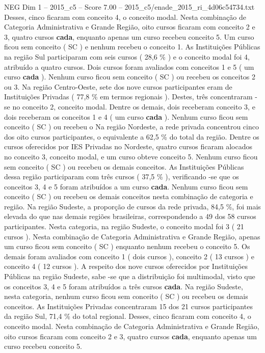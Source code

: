 \begin{textsample}{NEG Dim 1 – 2015\_c5 – Score 7.00 – 2015\_c5/enade\_2015\_ri\_4d06c54734.txt}
Desses, cinco ficaram com conceito 4, o conceito modal.
Nesta combinação de Categoria Administrativa e Grande Região, oito cursos ficaram com conceito 2 e 3, quatro cursos \textbf{cada}, enquanto apenas um curso recebeu conceito 5.
Um curso ficou sem conceito ( SC ) e nenhum recebeu o conceito 1.
As Instituições Públicas na região Sul participaram com seis cursos ( 28,6 \% ) e o conceito modal foi 4, atribuído a quatro cursos.
Dois cursos foram avaliados com conceitos 1 e 5 ( um curso \textbf{cada} ).
Nenhum curso ficou sem conceito ( SC ) ou recebeu os conceitos 2 ou 3.
Na região Centro-Oeste, sete dos nove cursos participantes eram de Instituições Privadas ( 77,8 \% em termos regionais ).
Destes, três concentraram -se no conceito 2, conceito modal.
Dentre os demais, dois receberam conceito 3, e dois receberam os conceitos 1 e 4 ( um curso \textbf{cada} ).
Nenhum curso ficou sem conceito ( SC ) ou recebeu o Na região Nordeste, a rede privada concentrou cinco dos oito cursos participantes, o equivalente a 62,5 \% do total da região.
Dentre os cursos oferecidos por IES Privadas no Nordeste, quatro cursos ficaram alocados no conceito 3, conceito modal, e um curso obteve conceito 5.
Nenhum curso ficou sem conceito ( SC ) ou recebeu os demais conceitos.
As Instituições Públicas dessa região participaram com três cursos ( 37,5 \% ), verificando -se que os conceitos 3, 4 e 5 foram atribuídos a um curso \textbf{cada}.
Nenhum curso ficou sem conceito ( SC ) ou recebeu os demais conceitos nesta combinação de categoria e região.
Na região Sudeste, a proporção de cursos da rede privada, 84,5 \%, foi mais elevada do que nas demais regiões brasileiras, correspondendo a 49 dos 58 cursos participantes.
Nesta categoria, na região Sudeste, o conceito modal foi 3 ( 21 cursos ).
Nesta combinação de Categoria Administrativa e Grande Região, apenas um curso ficou sem conceito ( SC ) enquanto nenhum recebeu o conceito 5.
Os demais foram avaliados com conceito 1 ( dois cursos ), conceito 2 ( 13 cursos ) e conceito 4 ( 12 cursos ).
A respeito dos nove cursos oferecidos por Instituições Públicas na região Sudeste, sabe -se que a distribuição foi multimodal, visto que os conceitos 3, 4 e 5 foram atribuídos a três cursos \textbf{cada}.
Na região Sudeste, nesta categoria, nenhum curso ficou sem conceito ( SC ) ou recebeu os demais conceitos.
As Instituições Privadas concentraram 15 dos 21 cursos participantes da região Sul, 71,4 \% do total regional.
Desses, cinco ficaram com conceito 4, o conceito modal.
Nesta combinação de Categoria Administrativa e Grande Região, oito cursos ficaram com conceito 2 e 3, quatro cursos \textbf{cada}, enquanto apenas um curso recebeu conceito 5.

\end{textsample}
